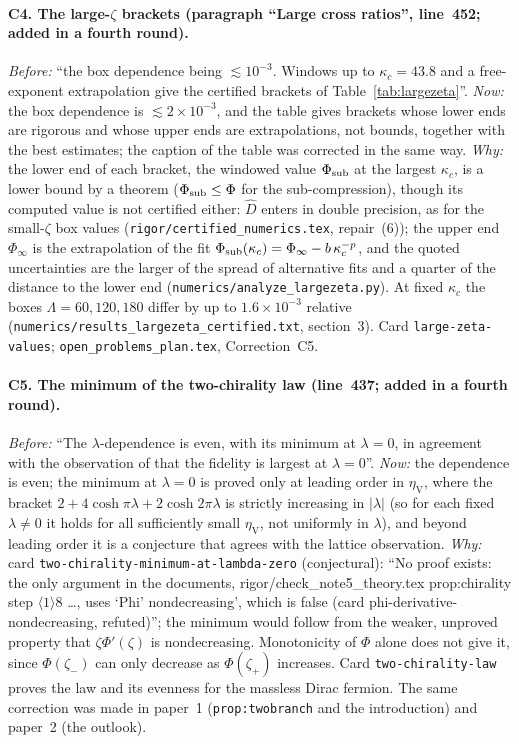 \documentclass[11pt]{article}
\theoremstyle{accent}
\theoremstyle{definition}
\begin{document}
{\paragraph{C4. The large-\(\zeta\) brackets (paragraph ``Large cross ratios'', line~452; added in a fourth
round).}
\emph{Before:} ``the box dependence being \(\lesssim10^{-3}\).  Windows up to \(\kappa_c=43.8\) and a
free-exponent extrapolation give the certified brackets of Table~\ref{tab:largezeta}''.
\emph{Now:} the box dependence is \(\lesssim2\times10^{-3}\), and the table gives brackets whose lower ends
are rigorous and whose upper ends are extrapolations, not bounds, together with the best estimates; the
caption of the table was corrected in the same way.
\emph{Why:} the lower end of each bracket, the windowed value \(\Phi_{\rm sub}\) at the largest \(\kappa_c\), is a lower bound by a theorem (\(\Phi_{\rm sub}\le\Phi\) for the sub-compression), though its computed value is not certified either: \(\widehat D\) enters in double precision, as for the small-\(\zeta\) box values (\texttt{rigor/certified\_numerics.tex}, repair~(6)); the upper end \(\Phi_\infty\) is the
extrapolation of the fit \(\Phi_{\rm sub}(\kappa_c)=\Phi_\infty-b\,\kappa_c^{-p}\), and the quoted
uncertainties are the larger of the spread of alternative fits and a quarter of the distance to the lower end (\texttt{numerics/analyze\_largezeta.py}).
At fixed \(\kappa_c\) the boxes \(\Lambda=60,120,180\) differ by up to \(1.6\times10^{-3}\) relative
(\texttt{numerics/results\_largezeta\_certified.txt}, section~3).  Card \texttt{large-zeta-values};
\texttt{open\_problems\_plan.tex}, Correction~C5.
\paragraph{C5. The minimum of the two-chirality law (line~437; added in a fourth round).}
\emph{Before:} ``The \(\lambda\)-dependence is even, with its minimum at \(\lambda=0\), in agreement with the
observation of \cite{VardhanWeiZou} that the fidelity is largest at \(\lambda=0\)''.
\emph{Now:} the dependence is even; the minimum at \(\lambda=0\) is proved only at leading order in
\(\eta_{\mathrm V}\), where the bracket \(2+4\cosh\pi\lambda+2\cosh2\pi\lambda\) is strictly increasing in
\(|\lambda|\) (so for each fixed \(\lambda\neq0\) it holds for all sufficiently small \(\eta_{\mathrm V}\), not
uniformly in \(\lambda\)), and beyond leading order it is a conjecture that agrees with the lattice observation.
\emph{Why:} card \texttt{two-chirality-minimum-at-lambda-zero} (conjectural): ``No proof exists: the only argument
in the documents, rigor/check\_note5\_theory.tex prop:chirality step \(\langle1\rangle8\) \dots, uses
`Phi' nondecreasing', which is false (card phi-derivative-nondecreasing, refuted)''; the minimum would follow from
the weaker, unproved property that \(\zeta\Phi'(\zeta)\) is nondecreasing.  Monotonicity of \(\Phi\) alone does
not give it, since \(\Phi(\zeta_-)\) can only decrease as \(\Phi(\zeta_+)\) increases.  Card
\texttt{two-chirality-law} proves the law and its evenness for the massless Dirac fermion.  The same correction
was made in paper~1 (\texttt{prop:twobranch} and the introduction) and paper~2 (the outlook).
\par}
\end{document}
